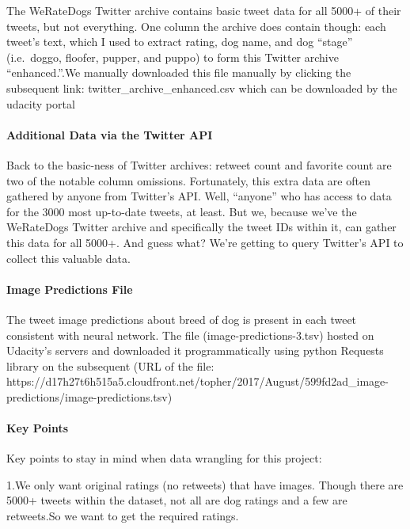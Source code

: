 \documentclass[11pt]{article}
\begin{document}
The WeRateDogs Twitter archive contains basic tweet data for all 5000+
of their tweets, but not everything. One column the archive does contain
though: each tweet's text, which I used to extract rating, dog name, and
dog ``stage'' (i.e.~doggo, floofer, pupper, and puppo) to form this
Twitter archive ``enhanced.''.We manually downloaded this file manually
by clicking the subsequent link: twitter\_archive\_enhanced.csv which
can be downloaded by the udacity portal

    \hypertarget{additional-data-via-the-twitter-api}{%
\paragraph{Additional Data via the Twitter
API}\label{additional-data-via-the-twitter-api}}

Back to the basic-ness of Twitter archives: retweet count and favorite
count are two of the notable column omissions. Fortunately, this extra
data are often gathered by anyone from Twitter's API. Well, ``anyone''
who has access to data for the 3000 most up-to-date tweets, at least.
But we, because we've the WeRateDogs Twitter archive and specifically
the tweet IDs within it, can gather this data for all 5000+. And guess
what? We're getting to query Twitter's API to collect this valuable
data.

    \hypertarget{image-predictions-file}{%
\paragraph{Image Predictions File}\label{image-predictions-file}}

The tweet image predictions about breed of dog is present in each tweet
consistent with neural network. The file (image-predictions-3.tsv)
hosted on Udacity's servers and downloaded it programmatically using
python Requests library on the subsequent (URL of the file:
https://d17h27t6h515a5.cloudfront.net/topher/2017/August/599fd2ad\_image-predictions/image-predictions.tsv)

    \hypertarget{key-points}{%
\paragraph{Key Points}\label{key-points}}

Key points to stay in mind when data wrangling for this project:

1.We only want original ratings (no retweets) that have images. Though
there are 5000+ tweets within the dataset, not all are dog ratings and a
few are retweets.So we want to get the required ratings.
\end{document}
